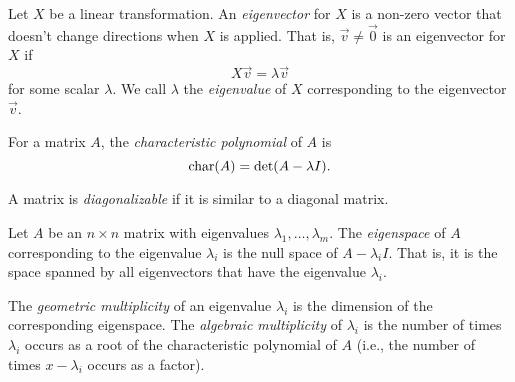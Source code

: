 \begin{SaveDefinition}[key=Eigenvector, title={Eigenvector}]
	Let $X$ be a linear transformation. An
	\emph{eigenvector} for $X$ is a non-zero vector that doesn't change
	directions when $X$ is applied. That is, $\vec v\neq \vec 0$ is an
	eigenvector for $X$ if
	\[
		X\vec v=\lambda \vec v
	\]
	 for some scalar $\lambda$. We call $\lambda$ the
	\emph{eigenvalue} of $X$ corresponding to the eigenvector $\vec v$.
\end{SaveDefinition}

\begin{SaveDefinition}[
	key=CharacteristicPolynomial,
	title={Characteristic Polynomial}]

	For a matrix $A$, the
	\emph{characteristic polynomial} of $A$ is
	\[
		\operatorname{char}(A)=\det(A-\lambda I).
	\]

\end{SaveDefinition}

\begin{SaveDefinition}[key=Diagonalizable, title={Diagonalizable}]
	A matrix is
	\emph{diagonalizable} if it is similar to a diagonal matrix.
\end{SaveDefinition}

\begin{SaveDefinition}[key=Eigenspace, title={Eigenspace}]
	Let $A$ be an $n\times n$ matrix with eigenvalues
	$\lambda_{1},\ldots,\lambda_{m}$. The
	\emph{eigenspace} of $A$ corresponding to the eigenvalue $\lambda_{i}$
	is the null space of $A-\lambda_{i} I$. That is, it is the space spanned
	by all eigenvectors that have the eigenvalue $\lambda_{i}$.

	The
	\emph{geometric multiplicity} of an eigenvalue $\lambda_{i}$ is the
	dimension of the corresponding eigenspace. The
	\emph{algebraic multiplicity} of $\lambda_{i}$ is the number of times
	$\lambda_{i}$ occurs as a root of the characteristic polynomial of $A$ (i.e.,
	the number of times $x-\lambda_{i}$ occurs as a factor).
\end{SaveDefinition}


